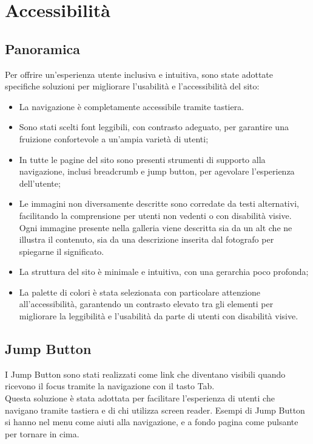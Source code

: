 \section{Accessibilit\`a}
\subsection{Panoramica}
Per offrire un'esperienza utente inclusiva e intuitiva, sono state adottate specifiche soluzioni per migliorare l'usabilità e l’accessibilità del sito:
\begin{itemize}
    \item La navigazione è completamente accessibile tramite tastiera.
    \item Sono stati scelti font leggibili, con contrasto adeguato, per garantire una fruizione confortevole a un’ampia varietà di utenti;
    \item In tutte le pagine del sito sono presenti strumenti di supporto alla navigazione, inclusi breadcrumb e jump button, per agevolare l’esperienza dell’utente;
    \item Le immagini non diversamente descritte sono corredate da testi alternativi, facilitando la comprensione per utenti non vedenti o con disabilità visive. Ogni immagine presente nella galleria viene descritta sia da un alt che ne illustra il contenuto, sia da una descrizione inserita dal fotografo per spiegarne il significato.
    \item La struttura del sito è minimale e intuitiva, con una gerarchia poco profonda;
    \item La palette di colori è stata selezionata con particolare attenzione all’accessibilità, garantendo un contrasto elevato tra gli elementi per migliorare la leggibilità e l’usabilità da parte di utenti con disabilità visive.
\end{itemize}

\subsection{Jump Button}
I Jump Button sono stati realizzati come link che diventano visibili quando ricevono il focus tramite la navigazione con il tasto Tab.\\
Questa soluzione è stata adottata per facilitare l’esperienza di utenti che navigano tramite tastiera e di chi utilizza screen reader.
Esempi di Jump Button si hanno nel menu come aiuti alla navigazione, e a fondo pagina come pulsante per tornare in cima.


